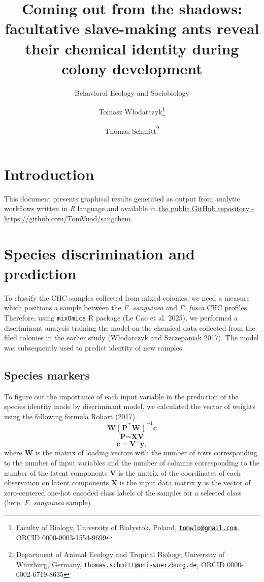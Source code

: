 \documentclass[
]{article}
\title{Coming out from the shadows: facultative slave-making ants reveal their chemical identity during colony development}
\subtitle{Behavioral Ecology and Sociobiology}
\author{Tomasz Włodarczyk\footnote{Faculty of Biology, University of Białystok, Poland, \href{mailto:tomwlo@gmail.com}{\nolinkurl{tomwlo@gmail.com}}, ORCID 0000-0003-1554-9699} \and Thomas Schmitt\footnote{Department of Animal Ecology and Tropical Biology, University of Würzburg, Germany, \href{mailto:thomas.schmitt@uni-wuerzburg.de}{\nolinkurl{thomas.schmitt@uni-wuerzburg.de}}, ORCID 0000-0002-6719-8635}}
\date{}
\begin{document}
\maketitle

{
\setcounter{tocdepth}{2}
\tableofcontents
}
\section{Introduction}\label{introduction}

This document presents graphical results generated as output from analytic workflows written in \emph{R} language and available in \href{https://github.com/TomVuod/sangchem}{the public GitHub repository - https://github.com/TomVuod/sangchem}.

\section{Species discrimination and prediction}\label{species-discrimination-and-prediction}

To classify the CHC samples collected from mixed colonies, we need a measure which positions a sample between the \emph{F. sanguinea} and \emph{F. fusca} CHC profiles. Therefore, using \texttt{mixOmics} R package (Le Cao et al. 2025), we performed a discriminant analysis training the model on the chemical data collected from the filed colonies in the earlier study (Włodarczyk and Szczepaniak 2017). The model was subsequently used to predict identity of new samples.

\subsection{Species markers}\label{species-markers}

To figure out the importance of each input variable in the prediction of the species identity made by discriminant model, we calculated the vector of weights using the following formula Rohart (2017).
\[
\textbf{W}(\textbf{P}^\intercal\textbf{W})^{-1}\textbf{c}
\]
\[
\textbf{P}=\textbf{X}\textbf{V}
\]
\[
\textbf{c}=\textbf{V}^\intercal\textbf{y},
\]
where\newline
\(\textbf{W}\) is the matrix of loading vectors with the number of rows corresponding to the number of input variables and the number of columns corresponding to the number of the latent components\newline
\(\textbf{V}\) is the matrix of the coordinates of each observation on latent components\newline 
\(\textbf{X}\) is the input data matrix\newline
\(\textbf{y}\) is the vector of zero-centered one-hot encoded class labels of the samples for a selected class (here, \emph{F. sanguinea} sample)
\end{document}
